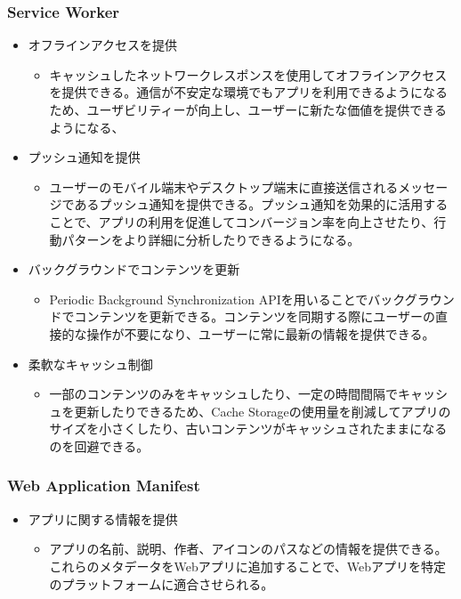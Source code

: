 \subsubsection{Service Worker}
\label{subsubsection:Service Worker}
\begin{itemize}
    \item オフラインアクセスを提供
    \begin{itemize}
        \item キャッシュしたネットワークレスポンスを使用してオフラインアクセスを提供できる。通信が不安定な環境でもアプリを利用できるようになるため、ユーザビリティーが向上し、ユーザーに新たな価値を提供できるようになる、
    \end{itemize}
    \item プッシュ通知を提供
    \begin{itemize}
        \item ユーザーのモバイル端末やデスクトップ端末に直接送信されるメッセージであるプッシュ通知を提供できる。プッシュ通知を効果的に活用することで、アプリの利用を促進してコンバージョン率を向上させたり、行動パターンをより詳細に分析したりできるようになる。
    \end{itemize}
    \item バックグラウンドでコンテンツを更新
    \begin{itemize}
        \item Periodic Background Synchronization APIを用いることでバックグラウンドでコンテンツを更新できる。コンテンツを同期する際にユーザーの直接的な操作が不要になり、ユーザーに常に最新の情報を提供できる。
    \end{itemize}
    \item 柔軟なキャッシュ制御
    \begin{itemize}
        \item 一部のコンテンツのみをキャッシュしたり、一定の時間間隔でキャッシュを更新したりできるため、Cache Storageの使用量を削減してアプリのサイズを小さくしたり、古いコンテンツがキャッシュされたままになるのを回避できる。
    \end{itemize}
\end{itemize}
\subsubsection{Web Application Manifest}
\label{subsubsection:Web Application Manifest}
\begin{itemize}
    \item アプリに関する情報を提供
    \begin{itemize}
        \item アプリの名前、説明、作者、アイコンのパスなどの情報を提供できる。これらのメタデータをWebアプリに追加することで、Webアプリを特定のプラットフォームに適合させられる。
    \end{itemize}
\end{itemize}
